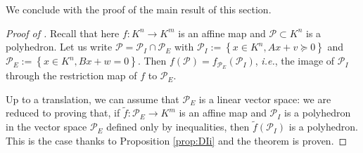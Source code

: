 \documentclass{elsarticle}
\theoremstyle{plain}
\theoremstyle{definition}
\newcommand{\PP}{\mathcal{P}}
\begin{document}
We conclude with the proof of the main result of this section.

\begin{proof}[Proof of ]
Recall that here $f : K^n \to K^m$ is an affine map and $\PP \subset K^n$ is a polyhedron.
Let us write $\PP = \PP_I \cap \PP_E$
with $\PP_I := \left\lbrace x \in K^n,  Ax+v \succeq 0 \right\rbrace$
and $\PP_E := \left\lbrace x \in K^n,  Bx+w=0 \right\rbrace$.
Then $f(\PP) = f_{\PP_E}(\PP_I)$, {\it i.e.}, the image of $\PP_I$ through the restriction
map of $f$ to $\PP_E$.

Up to a translation, we can assume that $\PP_E$ is a linear vector space:
we are reduced to proving that, if $\tilde{f}: \PP_E \to K^m$ is an affine map
and $\PP_I$ is a polyhedron in the vector space $\PP_E$ defined only by inequalities,
then $\tilde{f}(\PP_I)$ is a polyhedron. This is the case thanks to Proposition \ref{prop:DIi}
and the theorem is proven.
\end{proof}
\end{document}
